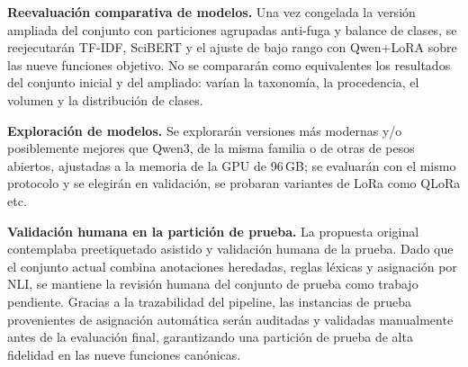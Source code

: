 \documentclass[10pt,a4paper,twocolumn]{article}
\begin{document}
\textbf{Reevaluación comparativa de modelos.} Una vez congelada la versión ampliada del conjunto con particiones agrupadas anti-fuga y balance de clases, se reejecutarán TF-IDF, SciBERT y el ajuste de bajo rango con Qwen+LoRA \cite{lora} sobre las nueve funciones objetivo. No se compararán como equivalentes los resultados del conjunto inicial y del ampliado: varían la taxonomía, la procedencia, el volumen y la distribución de clases.

\textbf{Exploración de modelos.} Se explorarán versiones más modernas y/o posiblemente mejores que Qwen3, de la misma familia o de otras de pesos abiertos, ajustadas a la memoria de la GPU de 96\,GB; se evaluarán con el mismo protocolo y se elegirán en validación, se probaran variantes de LoRa como QLoRa\cite{Dettmers2023} etc.

\textbf{Validación humana en la partición de prueba.} La propuesta original contemplaba preetiquetado asistido y validación humana de la prueba. Dado que el conjunto actual combina anotaciones heredadas, reglas léxicas y asignación por NLI, se mantiene la revisión humana del conjunto de prueba como trabajo pendiente. Gracias a la trazabilidad del pipeline, las instancias de prueba provenientes de asignación automática serán auditadas y validadas manualmente antes de la evaluación final, garantizando una partición de prueba de alta fidelidad en las nueve funciones canónicas.

{\small

% 

}

%
\end{document}
